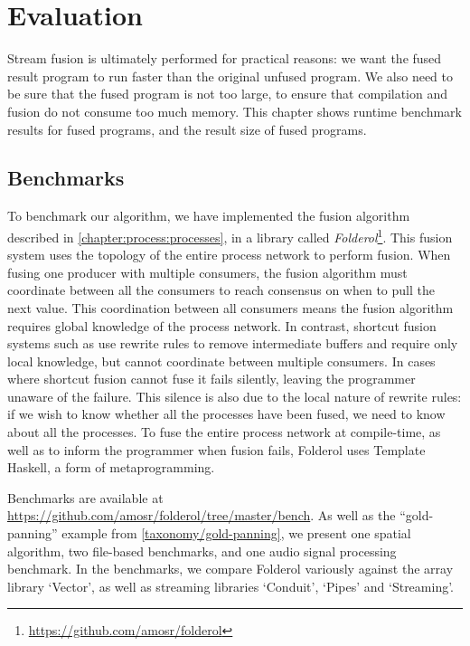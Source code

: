 \chapter{Evaluation}
\label{s:Benchmarks}
Stream fusion is ultimately performed for practical reasons: we want the fused result program to run faster than the original unfused program.
We also need to be sure that the fused program is not too large, to ensure that compilation and fusion do not consume too much memory.
This chapter shows runtime benchmark results for fused programs, and the result size of fused programs.

\section{Benchmarks}

To benchmark our algorithm, we have implemented the fusion algorithm described in \cref{chapter:process:processes}, in a library called \emph{Folderol}\footnote{\url{https://github.com/amosr/folderol}}.
This fusion system uses the topology of the entire process network to perform fusion.
When fusing one producer with multiple consumers, the fusion algorithm must coordinate between all the consumers to reach consensus on when to pull the next value.
This coordination between all consumers means the fusion algorithm requires global knowledge of the process network.
In contrast, shortcut fusion systems such as \cite{gill1993short} use rewrite rules to remove intermediate buffers and require only local knowledge, but cannot coordinate between multiple consumers.
In cases where shortcut fusion cannot fuse it fails silently, leaving the programmer unaware of the failure.
This silence is also due to the local nature of rewrite rules: if we wish to know whether all the processes have been fused, we need to know about all the processes.
To fuse the entire process network at compile-time, as well as to inform the programmer when fusion fails, Folderol uses Template Haskell, a form of metaprogramming.

Benchmarks are available at \url{https://github.com/amosr/folderol/tree/master/bench}.
As well as the ``gold-panning'' example from \cref{taxonomy/gold-panning}, we present one spatial algorithm, two file-based benchmarks, and one audio signal processing benchmark.
In the benchmarks, we compare Folderol variously against the array library `Vector', as well as streaming libraries `Conduit', `Pipes' and `Streaming'.

